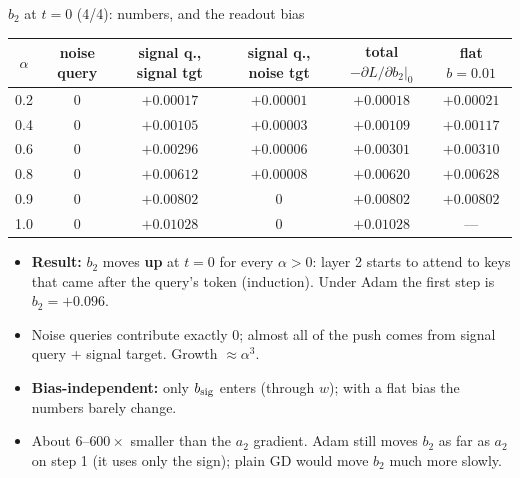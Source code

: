 \documentclass[aspectratio=169,11pt]{beamer}
\newcommand{\1}{\mathbf{1}}
\begin{document}
\begin{frame}{$b_2$ at $t=0$ (4/4): numbers, and the readout bias}
\footnotesize
\begin{center}\renewcommand{\arraystretch}{0.95}
\begin{tabular}{cccccc}\toprule
$\alpha$ & noise query & signal q., signal tgt & signal q., noise tgt & total $-\partial L/\partial b_2|_0$ & flat $b=0.01$\\\midrule
0.2 & $0$ & $+0.00017$ & $+0.00001$ & $+0.00018$ & $+0.00021$\\
0.4 & $0$ & $+0.00105$ & $+0.00003$ & $+0.00109$ & $+0.00117$\\
0.6 & $0$ & $+0.00296$ & $+0.00006$ & $+0.00301$ & $+0.00310$\\
0.8 & $0$ & $+0.00612$ & $+0.00008$ & $+0.00620$ & $+0.00628$\\
0.9 & $0$ & $+0.00802$ & $0$ & $+0.00802$ & $+0.00802$\\
1.0 & $0$ & $+0.01028$ & $0$ & $+0.01028$ & ---\\\bottomrule
\end{tabular}
\end{center}
\begin{itemize}
\item \textbf{Result:} $b_2$ moves \textbf{up} at $t=0$ for every $\alpha>0$: layer 2 starts to attend to keys that came after
the query's token (induction). Under Adam the first step is $b_2=+0.096$.
\item Noise queries contribute exactly $0$; almost all of the push comes from signal query + signal target. Growth $\approx\alpha^3$.
\item \textbf{Bias-independent:} only $b_{\rm sig}$ enters (through $w$); with a flat bias the numbers barely change.
\item About $6$--$600\times$ smaller than the $a_2$ gradient. Adam still moves $b_2$ as far as $a_2$ on step 1
(it uses only the sign); plain GD would move $b_2$ much more slowly.
\end{itemize}
\end{frame}
\end{document}
